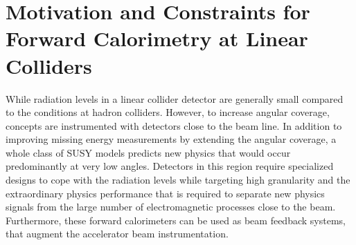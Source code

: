 \section{Motivation and Constraints for Forward Calorimetry at Linear Colliders}

While radiation levels in a linear collider detector are generally small compared to the conditions at hadron colliders. However, to increase angular coverage, concepts are instrumented with detectors close to the beam line. In addition to improving missing energy measurements by extending the angular coverage, a whole class of SUSY models predicts new physics that would occur predominantly at very low angles.
 Detectors in this region require specialized designs to cope with the radiation levels while targeting high granularity and the extraordinary physics performance that is required to separate new physics signals from the large number of electromagnetic processes close to the beam.
 Furthermore, these forward calorimeters can be used as beam feedback systems, that augment the accelerator beam instrumentation.
